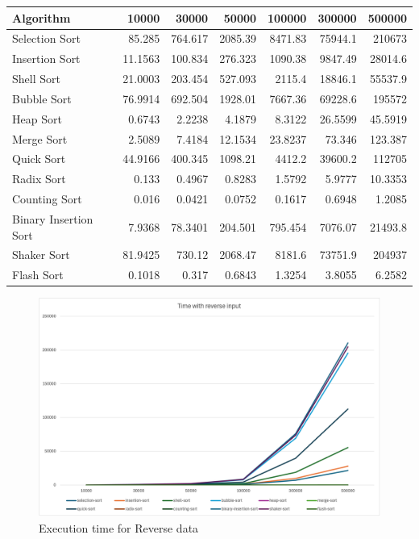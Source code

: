 \begin{table}[h!]
\centering
\begin{tabular}{|l|r|r|r|r|r|r|}
\hline
\textbf{Algorithm} & \textbf{10000} & \textbf{30000} & \textbf{50000} & \textbf{100000} & \textbf{300000} & \textbf{500000} \\
\hline
Selection Sort & 85.285 & 764.617 & 2085.39 & 8471.83 & 75944.1 & 210673 \\ \hline
Insertion Sort & 11.1563 & 100.834 & 276.323 & 1090.38 & 9847.49 & 28014.6 \\ \hline
Shell Sort & 21.0003 & 203.454 & 527.093 & 2115.4 & 18846.1 & 55537.9 \\ \hline
Bubble Sort & 76.9914 & 692.504 & 1928.01 & 7667.36 & 69228.6 & 195572 \\ \hline
Heap Sort & 0.6743 & 2.2238 & 4.1879 & 8.3122 & 26.5599 & 45.5919 \\ \hline
Merge Sort & 2.5089 & 7.4184 & 12.1534 & 23.8237 & 73.346 & 123.387 \\ \hline
Quick Sort & 44.9166 & 400.345 & 1098.21 & 4412.2 & 39600.2 & 112705 \\ \hline
Radix Sort & 0.133 & 0.4967 & 0.8283 & 1.5792 & 5.9777 & 10.3353 \\ \hline
Counting Sort & 0.016 & 0.0421 & 0.0752 & 0.1617 & 0.6948 & 1.2085 \\ \hline
Binary Insertion Sort & 7.9368 & 78.3401 & 204.501 & 795.454 & 7076.07 & 21493.8 \\ \hline
Shaker Sort & 81.9425 & 730.12 & 2068.47 & 8181.6 & 73751.9 & 204937 \\ \hline
Flash Sort & 0.1018 & 0.317 & 0.6843 & 1.3254 & 3.8055 & 6.2582 \\
\hline
\end{tabular}
\label{table:reverse_execution_time}
\end{table}

\begin{figure}[h]
    \centering
    \includegraphics[scale=.65]{Figures/Visualization/Reverse_time.png}
    \caption{Execution time for Reverse data}
    \label{fig:enter-label}
\end{figure}

